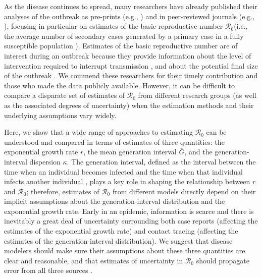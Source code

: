 \documentclass[12pt]{article}
\newcommand{\Ro}{\ensuremath{{\mathcal R}_{0}}\xspace}
\begin{document}
As the disease continues to spread, many researchers have already published their analyses of the outbreak as pre-prints (e.g., \cite{bedfordncov, imaincov, liuncov, majumderncov, readncov, zhaoncov}) and in peer-reviewed journals (e.g., \cite{li2020early, riou2020pattern, wu2020nowcasting, zhao2020preliminary}), focusing in particular on estimates of the basic reproductive number \Ro (i.e., the average number of secondary cases generated by a primary case in a fully susceptible population \citep{anderson1991infectious, diekmann1990definition}).
Estimates of the basic reproductive number are of interest during an outbreak because they provide information about the level of intervention required to interrupt transmission \citep{anderson1991infectious}, and about the potential final size of the outbreak \citep{anderson1991infectious, ma2006generality}.
We commend these researchers for their timely contribution and those who made the data publicly available.
However, it can be difficult to compare a disparate set of estimates of \Ro from different research groups (as well as the associated degrees of uncertainty) when the estimation methods and their underlying assumptions vary widely.

Here, we show that a wide range of approaches to estimating \Ro can be understood and compared in terms of estimates of three quantities: the exponential growth rate $r$, the mean generation interval $\bar G$, and the generation-interval dispersion $\kappa$.
The generation interval, defined as the interval between the time when an individual becomes infected and the time when that individual infects another individual \citep{svensson2007note}, plays a key role in shaping the relationship between $r$ and \Ro \citep{wearing2005appropriate, roberts2007model, wallinga2007generation, park2019practical};
therefore, estimates of \Ro from different models directly depend on their implicit assumptions about the generation-interval distribution and the exponential growth rate.
Early in an epidemic, information is scarce and there is inevitably a great deal of uncertainty surrounding both case reports (affecting the estimates of the exponential growth rate) and contact tracing (affecting the estimates of the generation-interval distribution).
We suggest that disease modelers should make sure their assumptions about these three quantities are clear and reasonable, and that estimates of uncertainty in \Ro should propagate error from all three sources \citep{elderd2006uncertainty}.
\end{document}
